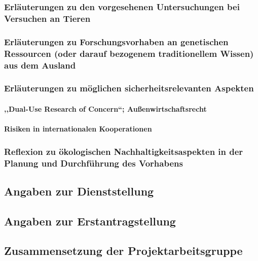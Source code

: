 \documentclass[de]{dfg-proposal}
\begin{document}

\subsubsection{Erläuterungen zu den vorgesehenen Untersuchungen bei Versuchen an Tieren}

\subsubsection{Erläuterungen zu Forschungsvorhaben an genetischen Ressourcen (oder darauf bezogenem traditionellem Wissen) aus dem Ausland}

\subsubsection{Erläuterungen zu möglichen sicherheitsrelevanten Aspekten}

\paragraph{,,Dual-Use Research of Concern``; Außenwirtschaftsrecht}

\paragraph{Risiken in internationalen Kooperationen}

\subsubsection{Reflexion zu ökologischen Nachhaltigkeitsaspekten in der Planung und Durchführung des Vorhabens}

\subsection{Angaben zur Dienststellung}

\subsection{Angaben zur Erstantragstellung}

\subsection{Zusammensetzung der Projektarbeitsgruppe}
\end{document}

